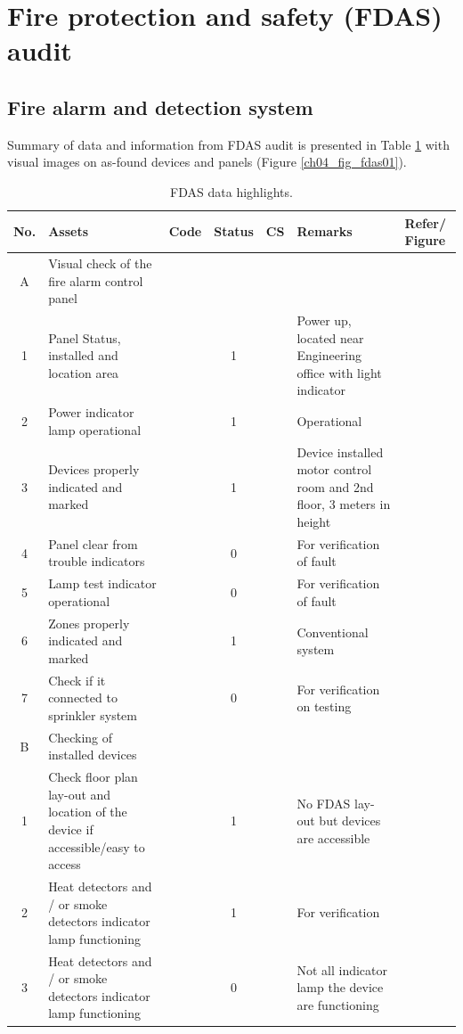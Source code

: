 \section{Fire protection and safety (FDAS) audit} \label{ch04fdas}

\subsection{Fire alarm and detection system} \label{ch04fdas01}
Summary of data and information from FDAS audit is presented in Table \ref{ch04_fdas01} with visual images on as-found devices and panels (Figure \ref{ch04_fig_fdas01}).
\begin{table}[!h]
	\caption{FDAS data highlights.}
	\label{ch04_fdas01}
	{\footnotesize
	\begin{tabular}{c|p{5cm}|c|c|c|p{4cm}|p{1cm}}
		\hline
		No. & Assets & Code & Status & CS & Remarks & Refer/ Figure \\ 
		\hline
		A & Visual check of the fire alarm control panel &  &  &  &  &  \\ 
		1 & Panel Status, installed and location area &  & 1 &  & Power up, located near Engineering office with light indicator &  \\ 
		2 & Power indicator lamp operational &  & 1 &  & Operational &  \\ 
		3 & Devices properly indicated and marked &  & 1 &  & Device installed \@ motor control room and 2nd floor, 3 meters in height &  \\ 
		4 & Panel clear from trouble indicators &  & 0 &  & For verification of fault &  \\ 
		5 & Lamp test indicator operational &  & 0 &  & For verification of fault &  \\ 
		6 & Zones properly indicated and marked &  & 1 &  & Conventional system &  \\ 
		7 & Check if it connected to sprinkler system &  & 0 &  & For verification on testing &  \\ 
		\hline
		B & Checking of installed devices &  &  &  &  &  \\ 
		1 & Check floor plan lay-out and location of the device if accessible/easy to access &  & 1 &  & No FDAS lay-out but devices are accessible &  \\ 
		2 & Heat detectors and / or smoke detectors indicator lamp functioning &  & 1 &  & For verification &  \\ 
		3 & Heat detectors and / or smoke detectors indicator lamp functioning &  & 0 &  & Not all indicator lamp \@ the device are functioning &  \\ 

\end{tabular}}
\end{table}
